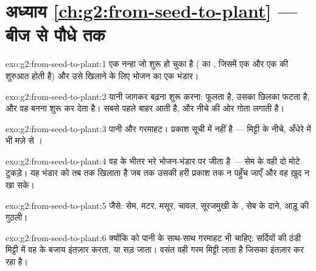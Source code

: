 \section*{अध्याय \ref{ch:g2:from-seed-to-plant} --- बीज से पौधे तक}

\begin{solution}{exo:g2:from-seed-to-plant:1}
एक नन्हा  जो शुरू हो चुका है ( का , जिसमें एक  और एक
 की शुरुआत होती है) और उसे खिलाने के लिए भोजन का एक भंडार।
\end{solution}

\begin{solution}{exo:g2:from-seed-to-plant:2}
 यानी जागकर बढ़ना शुरू करना:  फूलता है, उसका छिलका
फटता है, और वह  बनना शुरू कर देता है। सबसे पहले  बाहर आती है,
और नीचे की ओर गोता लगाती है।
\end{solution}

\begin{solution}{exo:g2:from-seed-to-plant:3}
पानी और गरमाहट। प्रकाश सूची में नहीं है ---  मिट्टी के नीचे,
अँधेरे में भी मज़े से ।
\end{solution}

\begin{solution}{exo:g2:from-seed-to-plant:4}
वह  के भीतर भरे भोजन-भंडार पर जीता है --- सेम के वही दो मोटे
टुकड़े। यह भंडार  को तब तक खिलाता है जब तक उसकी हरी 
प्रकाश तक न पहुँच जाएँ और वह ख़ुद न खा सके।
\end{solution}

\begin{solution}{exo:g2:from-seed-to-plant:5}
जैसे: सेम, मटर, मसूर, चावल, सूरजमुखी के , सेब के दाने, आड़ू की
गुठली।
\end{solution}

\begin{solution}{exo:g2:from-seed-to-plant:6}
क्योंकि  को पानी के साथ-साथ गरमाहट भी चाहिए: सर्दियों की ठंडी
मिट्टी में वह  के बजाय इंतज़ार करता, या सड़ जाता। वसंत
वही गरम मिट्टी लाता है जिसका  इंतज़ार कर रहा है।
\end{solution}

